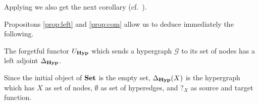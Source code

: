 \documentclass[3p]{elsarticle}
\newcommand{\catname}[1]{\textbf{\textup{#1}}}
\newcommand{\hyp}{\catname{Hyp}}
\theoremstyle{remark}
\theoremstyle{definition}
\begin{document}
Applying  we also get the next corollary (cf.~\cite[Fact 4.17]{ehrig2006fundamentals}).


Propositons \ref{prop:left} and \ref{prop:com} allow us to deduce immediately the following.

\begin{prop}\label{cor:left}  The forgetful functor $U_{\hyp}$ which sends a hypergraph $\mathcal{G}$ to its set of nodes has a left adjoint $\Delta_{\hyp}$.
\end{prop}

\begin{exa}Since the initial object of $\catname{Set}$ is the empty set,  $\Delta_{\hyp}(X)$ is the hypergraph which has $X$ as set of nodes, $\emptyset$ as set of hyperedges, and $?_X$ as source and target function.
\end{exa}

\end{document}
